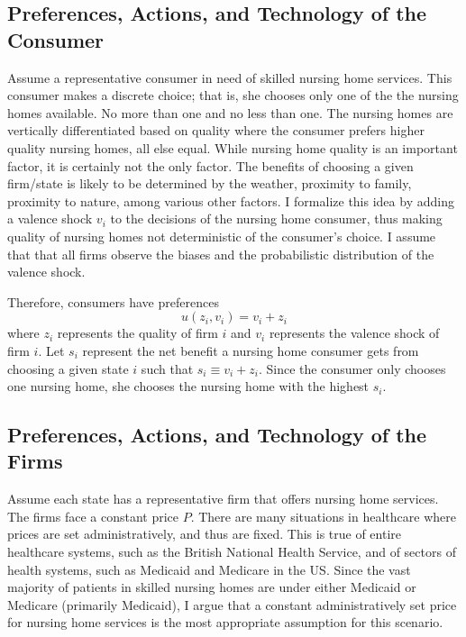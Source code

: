 \documentclass[../Main.tex]{subfiles}
\begin{document}
\subsection{Preferences, Actions, and Technology of the Consumer}
Assume a representative consumer in need of skilled nursing home services. This consumer makes a discrete choice; that is, she chooses only one of the the nursing homes available. No more than one and no less than one. The nursing homes are vertically differentiated based on quality where the consumer prefers higher quality nursing homes, all else equal. While nursing home quality is an important factor, it is certainly not the only factor. The benefits of choosing a given firm/state is likely to be determined by the weather, proximity to family, proximity to nature, among various other factors. I formalize this idea by adding a valence shock $v_i$ to the decisions of the nursing home consumer, thus making quality of nursing homes not deterministic of the consumer's choice. I assume that that all firms observe the biases and the probabilistic distribution of the valence shock. 

Therefore, consumers have preferences $$u(z_i,v_i) = v_i + z_i $$ where $z_i$ represents the quality of firm $i$ and $v_i$ represents the valence shock of firm $i$. Let $s_i$ represent the net benefit a nursing home consumer gets from choosing a given state $i$ such that $s_i \equiv v_i + z_i$. Since the consumer only chooses one nursing home, she chooses the nursing home with the highest $s_i$.

\subsection{Preferences, Actions, and Technology of the Firms}
Assume each state has a representative firm that offers nursing home services. The firms face a constant price $P$. There are many situations in healthcare where prices are set administratively, and thus are fixed. This is true of entire healthcare systems, such as the British National Health Service, and of sectors of health systems, such as Medicaid and Medicare in the US. Since the vast majority of patients in skilled nursing homes are under either Medicaid or Medicare (primarily Medicaid), I argue that a constant administratively set price for nursing home services is the most appropriate assumption for this scenario.
\end{document}
